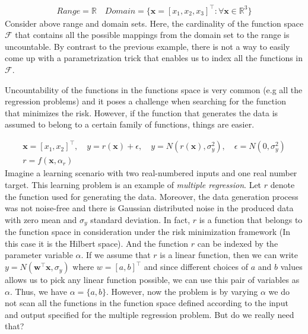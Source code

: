 {\begin{ex} 
\begin{align*}
&Range=\mathbb{R} \quad Domain=\{\pmb{x}=[x_1,x_2,x_3]^\top :\forall \pmb{x} \in \mathbb{R}^3\}&
\end{align*}
Consider above range and domain sets. Here, the cardinality of the function space $\mathcal{F}$ that contains all the possible mappings from the domain set to the range is uncountable. By contrast to the previous example, there is not a way to easily come up with a parametrization trick that enables us to index all the functions in $\mathcal{F}$.
\end{ex}

Uncountability of the functions in the functions space is very common (e.g all the regression problems) and it poses a challenge when searching for the function that minimizes the risk. However, if the function that generates the data is assumed to belong to a certain family of functions, things are easier. 

\begin{ex} 
\label{ex:regression_formulated}
\begin{align*}
&\pmb{x} = [x_1, x_2]^\top, \quad y = r(\pmb{x}) + \epsilon, \quad y = N(r(\pmb{x}),\sigma_y^2), \quad \epsilon  = N(0,\sigma_y^2) & \\
&r = f(\pmb{x},\alpha_{r})
\end{align*}
Imagine a learning scenario with two real-numbered inputs and one real number target. This learning problem is an example of \textit{multiple regression}. Let $r$ denote the function used for generating the data. Moreover, the data generation process was not noise-free and there is Gaussian distributed noise in the produced data with zero mean and $\sigma_y$ standard deviation. In fact, $r$ is a function that belongs to the function space in consideration under the risk minimization framework (In this case it is the Hilbert space). And the function $r$ can be indexed by the parameter variable $\alpha$. If we assume that $r$ is a linear function, then we can write $y=N(\pmb{w}^{\top} \pmb{x}, \sigma_y)$ where $w = [a,b]^\top$ and since different choices of $a$ and $b$ values allows us to pick any linear function possible, we can use this pair of variables as $\alpha$. Thus, we have $\alpha=\{a,b\}$. However, now the problem is by varying $\alpha$ we do not scan all the functions in the function space defined according to the input and output specified for the multiple regression problem. But do we really need that?
\end{ex} 

}
